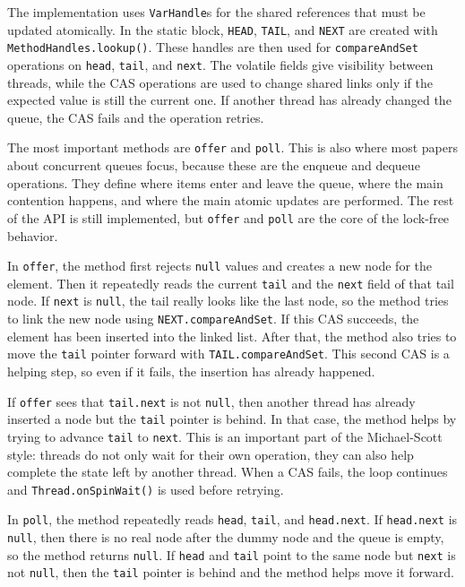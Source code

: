 The implementation uses \texttt{VarHandle}s for the shared references that must be updated atomically. In the static block, \texttt{HEAD}, \texttt{TAIL}, and \texttt{NEXT} are created with \texttt{MethodHandles.lookup()}. These handles are then used for \texttt{compareAndSet} operations on \texttt{head}, \texttt{tail}, and \texttt{next}. The volatile fields give visibility between threads, while the CAS operations are used to change shared links only if the expected value is still the current one. If another thread has already changed the queue, the CAS fails and the operation retries.

The most important methods are \texttt{offer} and \texttt{poll}. This is also where most papers about concurrent queues focus, because these are the enqueue and dequeue operations. They define where items enter and leave the queue, where the main contention happens, and where the main atomic updates are performed. The rest of the API is still implemented, but \texttt{offer} and \texttt{poll} are the core of the lock-free behavior.

In \texttt{offer}, the method first rejects \texttt{null} values and creates a new node for the element. Then it repeatedly reads the current \texttt{tail} and the \texttt{next} field of that tail node. If \texttt{next} is \texttt{null}, the tail really looks like the last node, so the method tries to link the new node using \texttt{NEXT.compareAndSet}. If this CAS succeeds, the element has been inserted into the linked list. After that, the method also tries to move the \texttt{tail} pointer forward with \texttt{TAIL.compareAndSet}. This second CAS is a helping step, so even if it fails, the insertion has already happened.


If \texttt{offer} sees that \texttt{tail.next} is not \texttt{null}, then another thread has already inserted a node but the \texttt{tail} pointer is behind. In that case, the method helps by trying to advance \texttt{tail} to \texttt{next}. This is an important part of the Michael-Scott style: threads do not only wait for their own operation, they can also help complete the state left by another thread. When a CAS fails, the loop continues and \texttt{Thread.onSpinWait()} is used before retrying.

In \texttt{poll}, the method repeatedly reads \texttt{head}, \texttt{tail}, and \texttt{head.next}. If \texttt{head.next} is \texttt{null}, then there is no real node after the dummy node and the queue is empty, so the method returns \texttt{null}. If \texttt{head} and \texttt{tail} point to the same node but \texttt{next} is not \texttt{null}, then the \texttt{tail} pointer is behind and the method helps move it forward.

